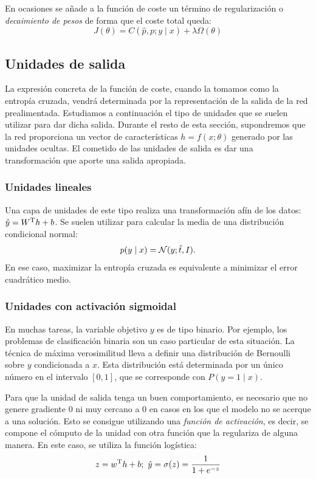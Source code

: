En ocasiones se añade a la función de coste un término de regularización
o \emph{decaimiento de pesos} de forma que el coste total queda:
\[J(\theta)=C(\hat p, p;y\mid x) + \lambda \Omega(\theta)\]

\subsection{Unidades de salida}\label{unidades-de-salida}

La expresión concreta de la función de coste, cuando la tomamos como la
entropía cruzada, vendrá determinada por la representación de la salida
de la red prealimentada. Estudiamos a continuación el tipo de unidades
que se suelen utilizar para dar dicha salida. Durante el resto de esta
sección, supondremos que la red proporciona un vector de características
\(h=f(x;\theta)\) generado por las unidades ocultas. El cometido de las
unidades de salida es dar una transformación que aporte una salida
apropiada.

\subsubsection{Unidades lineales}\label{unidades-lineales}

Una capa de unidades de este tipo realiza una transformación afín de los
datos: \(\hat y=W^{\mathrm{T}}h+b\). Se suelen utilizar para calcular la media de
una distribución condicional normal: \[p(y\mid x)=\mathcal{N}(y;\hat t,I).\] En
ese caso, maximizar la entropía cruzada es equivalente a minimizar el
error cuadrático medio.

\subsubsection{Unidades con activación
sigmoidal}\label{unidades-con-activaciuxf3n-sigmoidal}
En muchas tareas, la variable objetivo \(y\) es de tipo binario. Por
ejemplo, los problemas de clasificación binaria son un caso particular
de esta situación. La técnica de máxima verosimilitud lleva a definir
una distribución de Bernoulli sobre \(y\) condicionada a \(x\). Esta
distribución está determinada por un único número en el intervalo
\([0, 1]\), que se corresponde con \(P(y=1\mid x)\).

Para que la unidad de salida tenga un buen comportamiento, es necesario
que no genere gradiente $0$ ni muy cercano a $0$ en casos en los que el
modelo no se acerque a una solución. Esto se consigue utilizando una
\emph{función de activación}, es decir, se compone el cómputo de la
unidad con otra función que la regulariza de alguna manera. En este
caso, se utiliza la función logística:
\[z=w^{\mathrm{T}}h+b;\ \hat y = \sigma(z) = \frac{1}{1+e^{-z}}\]

